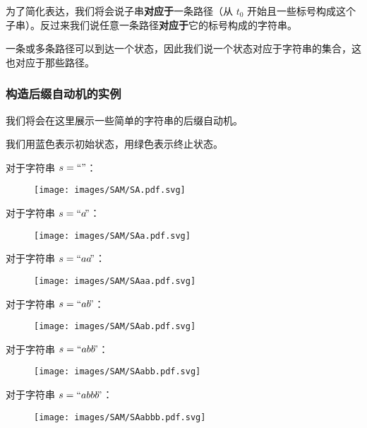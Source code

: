 为了简化表达，我们将会说子串\textbf{对应于}一条路径（从 $t_0$ 开始且一些标号构成这个子串）。反过来我们说任意一条路径\textbf{对应于}它的标号构成的字符串。

一条或多条路径可以到达一个状态，因此我们说一个状态对应于字符串的集合，这也对应于那些路径。

\subsubsection{构造后缀自动机的实例}

我们将会在这里展示一些简单的字符串的后缀自动机。

我们用蓝色表示初始状态，用绿色表示终止状态。

对于字符串 $s=``"$：

\begin{figure}[h]
\centering
\texttt{[image: images/SAM/SA.pdf.svg]} 

\end{figure}

对于字符串 $s=``a\!"$：

\begin{figure}[h]
\centering
\texttt{[image: images/SAM/SAa.pdf.svg]} 

\end{figure}

对于字符串 $s=``aa\!"$：

\begin{figure}[h]
\centering
\texttt{[image: images/SAM/SAaa.pdf.svg]} 

\end{figure}

对于字符串 $s=``ab\!"$：

\begin{figure}[h]
\centering
\texttt{[image: images/SAM/SAab.pdf.svg]} 

\end{figure}

对于字符串 $s=``abb\!"$：

\begin{figure}[h]
\centering
\texttt{[image: images/SAM/SAabb.pdf.svg]} 

\end{figure}

对于字符串 $s=``abbb\!"$：

\begin{figure}[h]
\centering
\texttt{[image: images/SAM/SAabbb.pdf.svg]} 

\end{figure}

